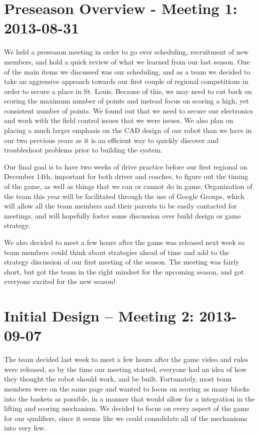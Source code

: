 \documentclass{article}
\begin{document}
\section{Preseason Overview - Meeting 1: 2013-08-31}
We held a preseason meeting in order to go over scheduling, recruitment of new members, and hold a quick review of what we learned from our last season. One of the main items we discussed was our scheduling, and as a team we decided to take an aggressive approach towards our first couple of regional competitions in order to secure a place in St. Louis. Because of this, we may need to cut back on scoring the maximum number of points and instead focus on scoring a high, yet consistent number of points. We found out that we need to secure our electronics and work with the field control issues that we were issues. We also plan on placing a much larger emphasis on the CAD design of our robot than we have in our two previous years as it is an efficient way to quickly discover and troubleshoot problems prior to building the system. 

Our final goal is to have two weeks of drive practice before our first regional on December 14th, important for both driver and coaches, to figure out the timing of the game, as well as things that we can or cannot do in game. Organization of the team this year will be facilitated through the use of Google Groups, which will allow all the team members and their parents to be easily contacted for meetings, and will hopefully foster some discussion over build design or game strategy. 

We also decided to meet a few hours after the game was released next week so team members could think about strategies ahead of time and add to the strategy discussion of our first meeting of the season. The meeting was fairly short, but got the team in the right mindset for the upcoming season, and got everyone excited for the  new season!

\newpage
\section{Initial Design -- Meeting 2: 2013-09-07}
The team decided last week to meet a few hours after the game video and rules were released, so by the time our meeting started, everyone had an idea of how they thought the robot should work, and be built. Fortunately, most team members were on the same page and wanted to focus on scoring as many blocks into the baskets as possible, in a manner that would allow for a integration in the lifting and scoring mechanism. We decided to focus on every aspect of the game for our qualifiers, since it seems like we could consolidate all of the mechanisms into very few.
\end{document}
